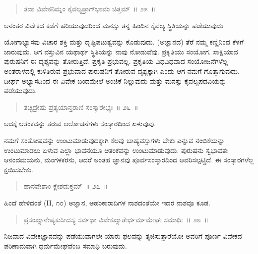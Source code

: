 \begin{verse}
ತದಾ ವಿವೇಕನಿಮ್ನಂ ಕೈವಲ್ಯಪ್ರಾಗ್​ಭಾವಂ ಚಿತ್ತಮ್​~॥ ೨೫~॥
\end{verse}

\vspace{-0.3cm}

ಅನಂತರ ವಿವೇಕದ ಕಡೆಗೆ ಹರಿಯುವುದರಿಂದ ಮನಸ್ಸು ತನ್ನ ಹಿಂದಿನ ಕೈವಲ್ಯ ಸ್ಥಿತಿಯನ್ನು ಪಡೆಯುವುದು. 

ಯೋಗಾಭ್ಯಾಸವು ವಿಚಾರ ಶಕ್ತಿ ಮತ್ತು ದೃಷ್ಟಿಪಟುತ್ವವನ್ನು ಕೊಡುವುದು. (ಅಜ್ಞಾನದ) ತೆರೆ ನಮ್ಮ ಕಣ್ಣಿನಿಂದ ಕೆಳಗೆ ಜಾರುವುದು. ಆಗ ವಸ್ತುವಿನ ಯಥಾರ್ಥ ಸ್ಥಿತಿಯನ್ನು ನಾವು ನೋಡುವೆವು. ಪ್ರಕೃತಿಯು ಸಂಯೋಗ. ಸಾಕ್ಷಿಯಾದ ಪುರುಷನಿಗೆ ಈ ದೃಶ್ಯವನ್ನು ತೋರುತ್ತಿದೆ. ಪ್ರಕೃತಿ ಪ್ರಭುವಲ್ಲ. ಪ್ರಕೃತಿಯ ವಿಧವಿಧವಾದ ಸಂಯೋಜನೆಗಳೆಲ್ಲ ಅಂತರಾಳದಲ್ಲಿ ಕುಳಿತಿರುವ ಪ್ರಭುವಾದ ಪುರುಷನಿಗೆ ತೋರುವ ದೃಶ್ಯಕ್ಕಾಗಿ ಎಂದು ಆಗ ನಮಗೆ ಗೊತ್ತಾಗುವುದು. ದೀರ್ಘ ಅಭ್ಯಾಸದಿಂದ ಈ ವಿವೇಕ ಬಂದಮೇಲೆ ಅಂಜಿಕೆ ನಿಲ್ಲುವುದು ಮತ್ತು ಮನಸ್ಸು ಕೈವಲ್ಯಪದವಿಯನ್ನು ಪಡೆಯುವುದು. 

\vspace{-0.3cm}

\begin{verse}
ತಚ್ಛಿದ್ರೇಷು ಪ್ರತ್ಯಯಾನ್ತರಾಣಿ ಸಂಸ್ಕಾರೇಭ್ಯಃ~॥ ೨೬~॥
\end{verse}

\vspace{-0.3cm}

ಅದಕ್ಕೆ ಆತಂಕವನ್ನು ತರುವ ಆಲೋಚನೆಗಳು ಸಂಸ್ಕಾರದಿಂದ ಏಳುವುವು. 

ನಮಗೆ ಸಂತೋಷವನ್ನು ಉಂಟುಮಾಡುವುದಕ್ಕಾಗಿ ಕೆಲವು ಬಾಹ್ಯವಸ್ತುಗಳು ಬೇಕು ಎನ್ನುವ ನಂಬಿಕೆಯನ್ನು ಉಂಟುಮಾಡಲು ಏಳುವ ಎಲ್ಲಾ ಭಾವನೆಯೂ ಆತಂಕವನ್ನು ಉಂಟುಮಾಡುವುದು. ಪುರುಷನು ಸ್ವಭಾವತಃ ಆನಂದಮಯನು, ಮಂಗಳಕರನು, ಆದರೆ ಅಂತಹ ಜ್ಞಾನವು ಪೂರ್ವಸಂಸ್ಕಾರದಿಂದ ಆವರಿಸಲ್ಪಟ್ಚಿದೆ. ಈ ಸಂಸ್ಕಾರಗಳೆಲ್ಲ ಕ್ಷಯಿಸಬೇಕು. 

\vspace{-0.3cm}

\begin{verse}
ಹಾನವೇಶಾಂ ಕ್ಲೇಶದುಕ್ತಮ್​~॥ ೨೭~॥
\end{verse}

\vspace{-0.3cm}

ಹಿಂದೆ ಹೇಳಿದಂತೆ (II, ೧೦) ಅಜ್ಞಾನ, ಅಹಂಕಾರಾದಿಗಳ ನಾಶದಂತೆಯೇ ಇದರ ನಾಶವೂ ಕೂಡ. 

\vspace{-0.3cm}

\begin{verse}
ಪ್ರಸಂಖ್ಯಾನೇಪ್ಯಕುಸೀದಸ್ಯ ಸರ್ವಥಾ ವಿವೇಕಖ್ಯಾತೇರ್ಧರ್ಮಮೇಘಃ ಸಮಾಧಿಃ~॥ ೨೮~॥
\end{verse}

\vspace{-0.3cm}

ನಿಜವಾದ ವಿವೇಕಜ್ಞಾನವನ್ನು ಪಡೆಯುವಾಗಲೇ ಯಾರು ಫಲವನ್ನು ತ್ಯಜಿಸುತ್ತಾರೆಯೋ ಅವರಿಗೆ ಪೂರ್ಣ ವಿವೇಕದ ಪರಿಣಾಮವಾಗಿ ಧರ್ಮಮೇಘವೆಂಬ ಸಮಾಧಿ ಬರುವುದು. 

